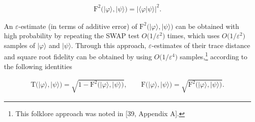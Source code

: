 \[\begin{gathered}
\mathrm{F}^{2}\lparen\lvert\varphi\rangle,\lvert\psi\rangle\rparen=\lvert\langle\varphi|\psi\rangle\rvert^{2}.
\end{gathered}\]


An $\varepsilon$-estimate (in terms of additive error) of $\mathrm{F}^{2}\lparen\lvert\varphi\rangle,\lvert\psi\rangle\rparen$ can be obtained with high probability by repeating the SWAP test $O\lparen 1/\varepsilon^{2}\rparen$ times, which uses $O\lparen 1/\varepsilon^{2}\rparen$ samples of $\lvert\varphi\rangle$ and $\lvert\psi\rangle$.
Through this approach, $\varepsilon$-estimates of their trace distance and square root fidelity can be obtained by using $O\lparen 1/\varepsilon^{4}\rparen$ samples,\footnote{This folklore approach was noted in [39, Appendix A].} according to the following identities\par


\[\begin{gathered}
\mathrm{T}\lparen\lvert\varphi\rangle,\lvert\psi\rangle\rparen=\sqrt{1-\mathrm{F}^{2}\lparen\lvert\varphi\rangle,\lvert\psi\rangle\rparen},\qquad\mathrm{F}\lparen\lvert\varphi\rangle,\lvert\psi\rangle\rparen=\sqrt{\mathrm{F}^{2}\lparen\lvert\varphi\rangle,\lvert\psi\rangle\rparen}.
\end{gathered}\]




